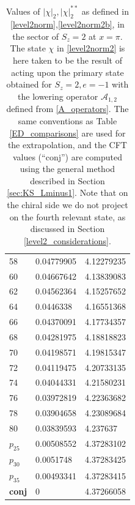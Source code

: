 \documentclass[a4paper,10pt]{article}
\newcommand{\linnea}[1]{$\framebox{\tiny L}$\ \textbf{\texttt{{\color{red}\footnotesize#1}}}}
\begin{document}
\begin{table}[H]
\begin{minipage}{0.5\textwidth}
\begin{tabular}{lll}
 58   & 0.04779905 & 4.12279235 \\
 60   & 0.04667642 & 4.13839083 \\
 62   & 0.04562364 & 4.15257652 \\
 64   & 0.0446338  & 4.16551368 \\
 66   & 0.04370091 & 4.17734357 \\
 68   & 0.04281975 & 4.18818823 \\
 70   & 0.04198571 & 4.19815347 \\
 72   & 0.04119475 & 4.20733135 \\
 74   & 0.04044331 & 4.21580231 \\
 76   & 0.03972819 & 4.22363682 \\
 78   & 0.03904658 & 4.23089684 \\
 80   & 0.03839593 & 4.237637   \\
 $p_{25}$ & 0.00508552 & 4.37283102 \\
 $p_{30}$ & 0.0051748  & 4.37283425 \\
 $p_{35}$ & 0.00493341 & 4.37283415 \\
 \bf{conj }& 0     & 4.37266058 \\ 
\end{tabular}
\end{minipage} \hfill
\caption{
Values of $|\chi|_2,|\chi|_2^{**}$ as defined in \eqref{level2norm},\eqref{level2norm2b}, in the sector of $S_z=2$ at $x=\pi$. The state $\chi$ in \eqref{level2norm2} is here taken to be the result of acting upon the primary state obtained for $S_z=2, e=-1$ with the lowering operator $\mathcal{A}_{1,2}$ defined from \eqref{A_operators}.%
%
The same conventions as Table \ref{ED_comparisons} are used for the extrapolation, and the CFT values (``conj'') are computed using the general method described in Section \ref{sec:KS_Lminus1}.
Note that on the chiral side we do not project on the fourth relevant state, as discussed in Section \ref{level2_considerations}.
}\label{level2}
\end{table}
\end{document}
